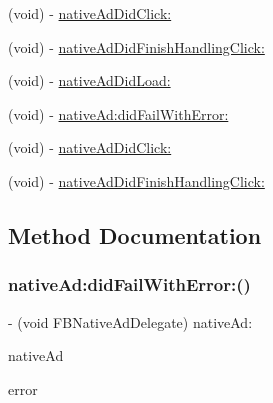\begin{DoxyCompactItemize}
\item 
(void) -\/ \hyperlink{protocolFBNativeAdDelegate_01-p_a6f95570584b282e947d029d855242d11}{native\+Ad\+Did\+Click\+:}
\item 
(void) -\/ \hyperlink{protocolFBNativeAdDelegate_01-p_a94d3846b43d38539da5f28804f75da70}{native\+Ad\+Did\+Finish\+Handling\+Click\+:}
\item 
(void) -\/ \hyperlink{protocolFBNativeAdDelegate_01-p_abad2ba96d5837eee4c2c7f88e216a9f5}{native\+Ad\+Did\+Load\+:}
\item 
(void) -\/ \hyperlink{protocolFBNativeAdDelegate_01-p_a310f7227d74f4223c64e2543ab346304}{native\+Ad\+:did\+Fail\+With\+Error\+:}
\item 
(void) -\/ \hyperlink{protocolFBNativeAdDelegate_01-p_a6f95570584b282e947d029d855242d11}{native\+Ad\+Did\+Click\+:}
\item 
(void) -\/ \hyperlink{protocolFBNativeAdDelegate_01-p_a94d3846b43d38539da5f28804f75da70}{native\+Ad\+Did\+Finish\+Handling\+Click\+:}
\end{DoxyCompactItemize}


\subsection{Method Documentation}
\mbox{\label{protocolFBNativeAdDelegate_01-p_a310f7227d74f4223c64e2543ab346304}} 
\subsubsection{\texorpdfstring{native\+Ad\+:did\+Fail\+With\+Error\+:()}{nativeAd:didFailWithError:()}\hspace{0.1cm}{\footnotesize\ttfamily [1/5]}}
{\footnotesize\ttfamily -\/ (void F\+B\+Native\+Ad\+Delegate) native\+Ad\+: \begin{DoxyParamCaption}\item[{(\hyperlink{interfaceFBNativeAd}{F\+B\+Native\+Ad} $\ast$)}]{native\+Ad }\item[{didFailWithError:(N\+S\+Error $\ast$)}]{error }\end{DoxyParamCaption}}

